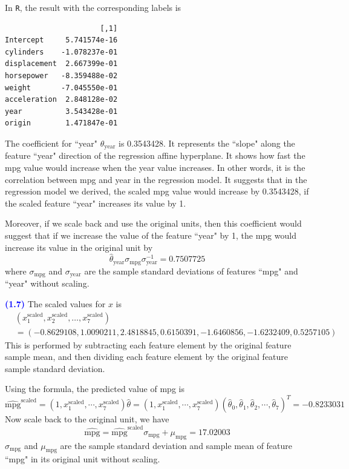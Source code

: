 \documentclass[a4paper,12pt]{article}
\newcommand{\code}[1]{\texttt{#1}}
\newcommand{\qnum}[1]{\noindent\textcolor{blue}{\textbf{(#1)}}}
\newcommand{\tx}[1]{\text{#1}}
\newcommand{\ba}{\[\begin{aligned}}
\newcommand{\ea}{\end{aligned}\]}
\begin{document}
In \code{R}, the result with the corresponding labels is 
\begin{verbatim}
                      [,1]
Intercept     5.741574e-16
cylinders    -1.078237e-01
displacement  2.667399e-01
horsepower   -8.359488e-02
weight       -7.045550e-01
acceleration  2.848128e-02
year          3.543428e-01
origin        1.471847e-01
\end{verbatim}

The coefficient for ``year" $\theta_{\tx{year}}$ is 0.3543428. It represents the ``slope" along the feature ``year" direction of the regression affine hyperplane. It shows how fast the mpg value would increase when the year value increases. In other words, it is the correlation between mpg and year in the regression model. It suggests that in the regression model we derived, the scaled mpg value would increase by 0.3543428, if the scaled feature ``year" increases its value by 1.

Moreover, if we scale back and use the original units, then this coefficient would suggest that if we increase the value of the feature ``year" by 1, the mpg would increase its value in the original unit by
\[
    \hat\theta_{\tx{year}}\sigma_{\tx{mpg}}\sigma_{\tx{year}}^{-1}
    = 0.7507725
\]
where $\sigma_{\tx{mpg}}$ and $\sigma_{\tx{year}}$ are the sample standard deviations of features ``mpg" and ``year" without scaling.
\bigskip



\qnum{1.7}
The scaled values for $x$ is 
\ba 
     & (x_1^{\tx{scaled}}, x_2^{\tx{scaled}},\ldots ,x_7^{\tx{scaled}})\\
    &= (  -0.8629108,    1.0090211,    2.4818845,    0.6150391,   -1.6460856, -1.6232409,   0.5257105)
\ea 
This is performed by subtracting each feature element by the original feature sample mean, and then dividing each feature element by the original feature sample standard deviation.

Using the formula, the predicted value of mpg is
\[
    \hat{\tx{mpg}}^{\tx{scaled}} =
    (1,x_1^{\tx{scaled}},\cdots,x_7^{\tx{scaled}})\hat\theta =  (1,x_1^{\tx{scaled}},\cdots,x_7^{\tx{scaled}})(\hat\theta_0, \hat\theta_1, \hat\theta_2, \cdots, \hat\theta_7)^T
    = -0.8233031
\]
Now scale back to the original unit, we have
\[
    \hat{\tx{mpg}} = \hat{\tx{mpg}}^{\tx{scaled}} \sigma_{\tx{mpg}} + \mu_{\tx{mpg}}
    = 17.02003
\]
$\sigma_{\tx{mpg}}$ and $\mu_{\tx{mpg}}$ are the sample standard deviation and sample mean of feature ``mpg" in its original unit without scaling.
\end{document}
